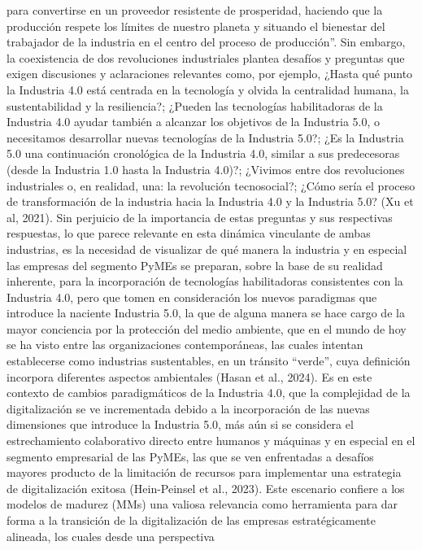 \documentclass{article}
\begin{document}
para convertirse en un proveedor resistente de prosperidad, haciendo que
la producción respete los límites de nuestro planeta y situando el
bienestar del trabajador de la industria en el centro del proceso de
producción''. Sin embargo, la coexistencia de dos revoluciones
industriales plantea desafíos y preguntas que exigen discusiones y
aclaraciones relevantes como, por ejemplo, ¿Hasta qué punto la Industria
4.0 está centrada en la tecnología y olvida la centralidad humana, la
sustentabilidad y la resiliencia?; ¿Pueden las tecnologías habilitadoras
de la Industria 4.0 ayudar también a alcanzar los objetivos de la
Industria 5.0, o necesitamos desarrollar nuevas tecnologías de la
Industria 5.0?; ¿Es la Industria 5.0 una continuación cronológica de la
Industria 4.0, similar a sus predecesoras (desde la Industria 1.0 hasta
la Industria 4.0)?; ¿Vivimos entre dos revoluciones industriales o, en
realidad, una: la revolución tecnosocial?; ¿Cómo sería el proceso de
transformación de la industria hacia la Industria 4.0 y la Industria
5.0? (Xu et al, 2021). Sin perjuicio de la importancia de estas
preguntas y sus respectivas respuestas, lo que parece relevante en esta
dinámica vinculante de ambas industrias, es la necesidad de visualizar
de qué manera la industria y en especial las empresas del segmento PyMEs
se preparan, sobre la base de su realidad inherente, para la
incorporación de tecnologías habilitadoras consistentes con la Industria
4.0, pero que tomen en consideración los nuevos paradigmas que introduce
la naciente Industria 5.0, la que de alguna manera se hace cargo de la
mayor conciencia por la protección del medio ambiente, que en el mundo
de hoy se ha visto entre las organizaciones contemporáneas, las cuales
intentan establecerse como industrias sustentables, en un tránsito
``verde'', cuya definición incorpora diferentes aspectos ambientales
(Hasan et al., 2024). Es en este contexto de cambios paradigmáticos de
la Industria 4.0, que la complejidad de la digitalización se ve
incrementada debido a la incorporación de las nuevas dimensiones que
introduce la Industria 5.0, más aún si se considera el estrechamiento
colaborativo directo entre humanos y máquinas y en especial en el
segmento empresarial de las PyMEs, las que se ven enfrentadas a desafíos
mayores producto de la limitación de recursos para implementar una
estrategia de digitalización exitosa (Hein-Peinsel et al., 2023). Este
escenario confiere a los modelos de madurez (MMs) una valiosa relevancia
como herramienta para dar forma a la transición de la digitalización de
las empresas estratégicamente alineada, los cuales desde una perspectiva
\end{document}
